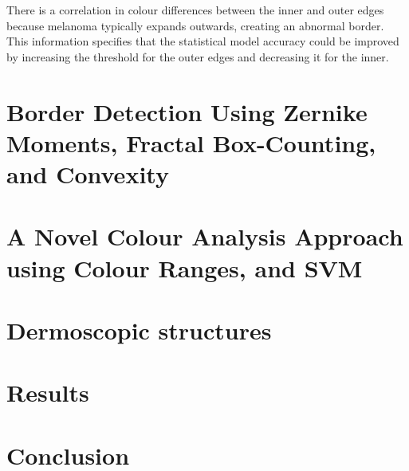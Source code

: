 There is a correlation in colour differences between the inner and outer edges because melanoma typically expands outwards, creating an abnormal border. This information specifies that the statistical model accuracy could be improved by increasing the threshold for the outer edges and decreasing it for the inner.

\section{Border Detection Using Zernike Moments, 
Fractal Box-Counting, and Convexity}


\section{A Novel Colour Analysis Approach using Colour Ranges, and SVM}


\section{Dermoscopic structures}

\section{Results}


\section{Conclusion}





